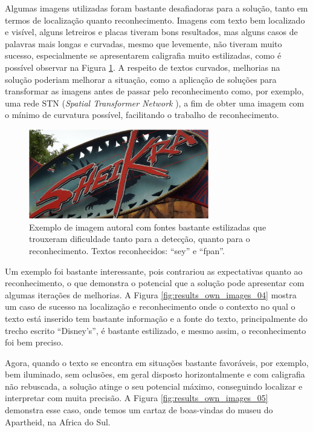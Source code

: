 Algumas imagens utilizadas foram bastante desafiadoras para a solução, tanto em termos de localização quanto reconhecimento. Imagens com texto bem localizado e visível, alguns letreiros e placas tiveram bons resultados, mas alguns casos de palavras mais longas e curvadas, mesmo que levemente, não tiveram muito sucesso, especialmente se apresentarem caligrafia muito estilizadas, como é possível observar na Figura \ref{fig:results_own_images_03}. A respeito de textos curvados, melhorias na solução poderiam melhorar a situação, como a aplicação de soluções para transformar as imagens antes de passar pelo reconhecimento como, por exemplo, uma rede STN (\textit{Spatial Transformer Network} \cite{STN}), a fim de obter uma imagem com o mínimo de curvatura possível, facilitando o trabalho de reconhecimento.

\begin{figure}
    \centering
    \includegraphics[width=0.7\textwidth]{figs/resultados-autoral-03.png}
    \caption{Exemplo de imagem autoral com fontes bastante estilizadas que trouxeram dificuldade tanto para a detecção, quanto para o reconhecimento. Textos reconhecidos: “sey” e “fpan”.}
    \label{fig:results_own_images_03}
\end{figure}


Um exemplo foi bastante interessante, pois contrariou as expectativas quanto ao reconhecimento, o que demonstra o potencial que a solução pode apresentar com algumas iterações de melhorias. A Figura \ref{fig:results_own_images_04} mostra um caso de sucesso na localização e reconhecimento onde o contexto no qual o texto está inserido tem bastante informação e a fonte do texto, principalmente do trecho escrito “Disney’s”, é bastante estilizado, e mesmo assim, o reconhecimento foi bem preciso.


Agora, quando o texto se encontra em situações bastante favoráveis, por exemplo, bem iluminado, sem oclusões, em geral disposto horizontalmente e com caligrafia não rebuscada, a solução atinge o seu potencial máximo, conseguindo localizar e interpretar com muita precisão. A Figura \ref{fig:results_own_images_05} demonstra esse caso, onde temos um cartaz de boas-vindas do museu do Apartheid, na Africa do Sul.

